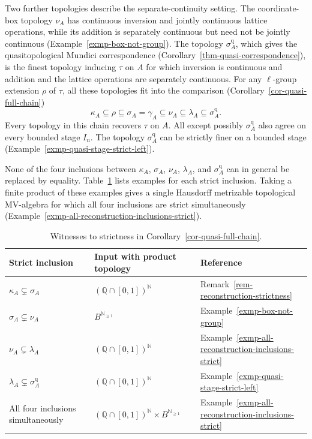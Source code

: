 \documentclass[preprint,3p]{elsarticle}
\theoremstyle{plain}
\theoremstyle{definition}
\numberwithin{equation}{section}
\begin{document}
Two further topologies describe the separate-continuity setting.
The coordinate-box topology $\nu_A$ has continuous inversion and
jointly continuous lattice operations, while its addition is separately
continuous but need not be jointly continuous
(Example~\ref{exmp-box-not-group}).
The topology $\sigma_A^{\mathrm q}$, which gives the quasitopological
Mundici correspondence (Corollary~\ref{thm-quasi-correspondence}), is the
finest topology inducing $\tau$ on $A$ for which inversion is continuous
and addition and the lattice operations are separately continuous.
For any $\ell$-group extension $\rho$ of $\tau$, all these topologies
fit into the comparison
(Corollary~\ref{cor-quasi-full-chain})
\[
 \kappa_A\subseteq\rho\subseteq\sigma_A=\gamma_A
 \subseteq\nu_A\subseteq\lambda_A
 \subseteq\sigma_A^{\mathrm q}.
\]
Every topology in this chain recovers $\tau$ on $A$.
All except possibly $\sigma_A^{\mathrm q}$ also agree on every
bounded stage $I_n$.  The topology $\sigma_A^{\mathrm q}$ can be
strictly finer on a bounded stage
(Example~\ref{exmp-quasi-stage-strict-left}).

None of the four inclusions between $\kappa_A$, $\sigma_A$,
$\nu_A$, $\lambda_A$, and $\sigma_A^{\mathrm q}$ can in general
be replaced by equality.
Table~\ref{tab-reconstruction-strictness} lists examples for each
strict inclusion.  Taking a finite product of these examples gives
a single Hausdorff metrizable topological MV-algebra for which
all four inclusions are strict simultaneously
(Example~\ref{exmp-all-reconstruction-inclusions-strict}).

\begin{table}[!htb]
\centering
\small
\renewcommand{\arraystretch}{1.25}
\begin{tabular}{@{}>{\raggedright\arraybackslash}p{}
                  >{\raggedright\arraybackslash}p{}
                  >{\raggedright\arraybackslash}p{}@{}}
\hline
Strict inclusion & Input with product topology & Reference\\
\hline
$\kappa_A\subsetneq\sigma_A$ &
$(\mathbb Q\cap[0,1])^{\mathbb N}$ &
Remark~\ref{rem-reconstruction-strictness}\\
$\sigma_A\subsetneq\nu_A$ &
$B^{\mathbb N_{\geq1}}$ &
Example~\ref{exmp-box-not-group}\\
$\nu_A\subsetneq\lambda_A$ &
$(\mathbb Q\cap[0,1])^{\mathbb N}$ &
Example~\ref{exmp-all-reconstruction-inclusions-strict}\\
$\lambda_A\subsetneq\sigma_A^{\mathrm q}$ &
$(\mathbb Q\cap[0,1])^{\mathbb N}$ &
Example~\ref{exmp-quasi-stage-strict-left}\\
All four inclusions simultaneously &
$(\mathbb Q\cap[0,1])^{\mathbb N}\times B^{\mathbb N_{\geq1}}$ &
Example~\ref{exmp-all-reconstruction-inclusions-strict}\\
\hline
\end{tabular}
\caption{Witnesses to strictness in
Corollary~\ref{cor-quasi-full-chain}.}
\label{tab-reconstruction-strictness}
\end{table}
\end{document}
